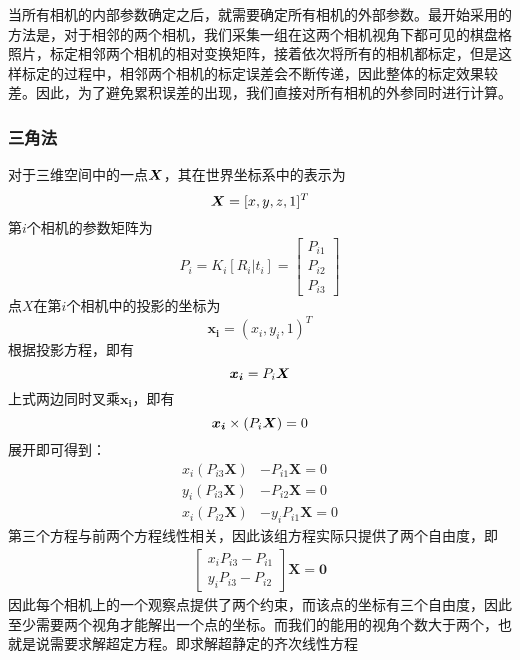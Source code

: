 当所有相机的内部参数确定之后，就需要确定所有相机的外部参数。最开始采用的方法是，对于相邻的两个相机，我们采集一组在这两个相机视角下都可见的棋盘格照片，标定相邻两个相机的相对变换矩阵，接着依次将所有的相机都标定，但是这样标定的过程中，相邻两个相机的标定误差会不断传递，因此整体的标定效果较差。因此，为了避免累积误差的出现，我们直接对所有相机的外参同时进行计算。

\subsubsection{三角法}
对于三维空间中的一点${\bm{X}}$，其在世界坐标系中的表示为
\begin{equation}
    {\bm{X}} = [x,y,z,1]^T
\end{equation}
第$i$个相机的参数矩阵为
\begin{equation}
    P_i = K_i[R_i | t_i] = \left[ \begin{array}{c}
        P_{i1} \\ P_{i2} \\ P_{i3}
    \end{array}\right]  
\end{equation}
点$X$在第$i$个相机中的投影的坐标为
\begin{equation}
    \bm{x_i} = (x_i, y_i, 1)^T    
\end{equation}
根据投影方程，即有
\begin{equation}
    \bm{x_i} = P_i{\bm{X}}
\end{equation}
上式两边同时叉乘$\bm{x_i}$，即有
\begin{equation}
    \bm{x_i} \times (P_i{\bm{X}}) = 0
\end{equation}
展开即可得到：
\begin{align}
    x_i(P_{i3}\bm{X}) &- P_{i1}\bm{X} = 0 \\
    y_i(P_{i3}\bm{X}) &- P_{i2}\bm{X}= 0 \\
    x_i(P_{i2}\bm{X}) &- y_iP_{i1}\bm{X}= 0
\end{align}
第三个方程与前两个方程线性相关，因此该组方程实际只提供了两个自由度，即
\begin{align}
    \left[ \begin{array}{c}
        x_iP_{i3} - P_{i1} \\ y_iP_{i3} - P_{i2}
    \end{array}\right]\bm{X} = \bm{0}
\end{align}
因此每个相机上的一个观察点提供了两个约束，而该点的坐标有三个自由度，因此至少需要两个视角才能解出一个点的坐标。而我们的能用的视角个数大于两个，也就是说需要求解超定方程。即求解超静定的齐次线性方程
